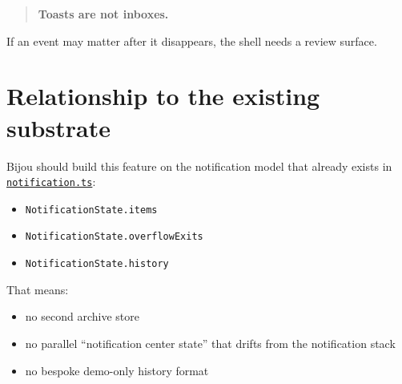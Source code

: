 \begin{quote}
\textbf{Toasts are not inboxes.}
\end{quote}

If an event may matter after it disappears, the shell needs a review surface.

\section{Relationship to the existing substrate}\label{record-053-relationship-to-the-existing-substrate}

Bijou should build this feature on the notification model that already exists in \href{https://github.com/flyingrobots/bijou/blob/cbd70612140e7a450d764b3c7be1c6af878b99bc/packages/bijou-tui/src/notification.ts}{\texttt{n\allowbreak{}o\allowbreak{}t\allowbreak{}i\allowbreak{}f\allowbreak{}i\allowbreak{}c\allowbreak{}a\allowbreak{}t\allowbreak{}i\allowbreak{}o\allowbreak{}n\allowbreak{}.\allowbreak{}t\allowbreak{}s}}:

\begin{itemize}
\tightlist
\item
  \texttt{N\allowbreak{}o\allowbreak{}t\allowbreak{}i\allowbreak{}f\allowbreak{}i\allowbreak{}c\allowbreak{}a\allowbreak{}t\allowbreak{}i\allowbreak{}o\allowbreak{}n\allowbreak{}S\allowbreak{}t\allowbreak{}a\allowbreak{}t\allowbreak{}e\allowbreak{}.\allowbreak{}i\allowbreak{}t\allowbreak{}e\allowbreak{}m\allowbreak{}s}
\item
  \texttt{N\allowbreak{}o\allowbreak{}t\allowbreak{}i\allowbreak{}f\allowbreak{}i\allowbreak{}c\allowbreak{}a\allowbreak{}t\allowbreak{}i\allowbreak{}o\allowbreak{}n\allowbreak{}S\allowbreak{}t\allowbreak{}a\allowbreak{}t\allowbreak{}e\allowbreak{}.\allowbreak{}o\allowbreak{}v\allowbreak{}e\allowbreak{}r\allowbreak{}f\allowbreak{}l\allowbreak{}o\allowbreak{}w\allowbreak{}E\allowbreak{}x\allowbreak{}i\allowbreak{}t\allowbreak{}s}
\item
  \texttt{N\allowbreak{}o\allowbreak{}t\allowbreak{}i\allowbreak{}f\allowbreak{}i\allowbreak{}c\allowbreak{}a\allowbreak{}t\allowbreak{}i\allowbreak{}o\allowbreak{}n\allowbreak{}S\allowbreak{}t\allowbreak{}a\allowbreak{}t\allowbreak{}e\allowbreak{}.\allowbreak{}h\allowbreak{}i\allowbreak{}s\allowbreak{}t\allowbreak{}o\allowbreak{}r\allowbreak{}y}
\end{itemize}

That means:

\begin{itemize}
\tightlist
\item
  no second archive store
\item
  no parallel ``notification center state'' that drifts from the notification stack
\item
  no bespoke demo-only history format
\end{itemize}

